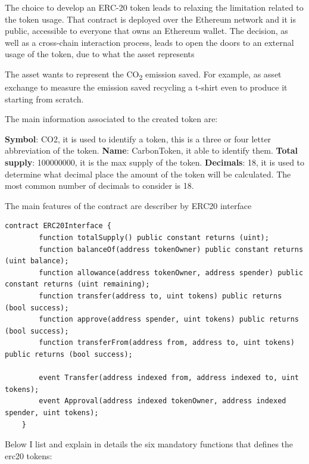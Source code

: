 The choice to develop an ERC-20 token leads to relaxing the limitation related to the token usage. That 
contract is deployed over the Ethereum network and it is public, accessible to everyone that owns an Ethereum 
wallet. The decision, as well as a cross-chain interaction process, leads to open the doors to an external usage 
of the token, due to what the asset represents
\bigskip

The asset wants to represent the CO\textsubscript{2} emission saved. For example, as asset exchange to measure 
the emission saved recycling a t-shirt even to produce it starting from scratch.
\bigskip

The main information associated to the created token are: 

\begin{outline}
    \1 \textbf{Symbol}: CO2, it is used to identify a token, this is a three or four letter abbreviation of the token.
    \1 \textbf{Name}: CarbonToken, it able to identify them.
    \1 \textbf{Total supply}: 100000000, it is the max supply of the token.
    \1 \textbf{Decimals}: 18, it is used to determine what decimal place the amount of the token will be calculated. 
    The most common number of decimals to consider is 18. 
\end{outline}

The main features of the contract are describer by ERC20 interface

\begin{lstlisting}[language=Solidity]
    contract ERC20Interface {
        function totalSupply() public constant returns (uint);
        function balanceOf(address tokenOwner) public constant returns (uint balance);
        function allowance(address tokenOwner, address spender) public constant returns (uint remaining);
        function transfer(address to, uint tokens) public returns (bool success);
        function approve(address spender, uint tokens) public returns (bool success);
        function transferFrom(address from, address to, uint tokens) public returns (bool success);
    
        event Transfer(address indexed from, address indexed to, uint tokens);
        event Approval(address indexed tokenOwner, address indexed spender, uint tokens);
    }
\end{lstlisting}

\bigskip

Below I list and explain in details the six mandatory functions that defines the erc20 tokens:

